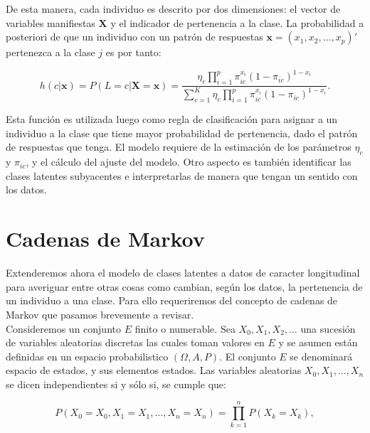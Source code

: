 		De esta manera, cada individuo es descrito por dos dimensiones: el vector de variables manifiestas $\boldsymbol{X}$ y el indicador de pertenencia a la clase.
		La probabilidad a posteriori de que un individuo con un patr\'{o}n de respuestas $\boldsymbol{x}=(x_{1}, x_{2},\ldots, x_{p})'$ pertenezca a la clase 
		$j$ es por tanto:
		
		\begin{equation}
			h(c | \mathbf{x}) = P(L=c | \mathbf{X}=\mathbf{x}) = \frac{\eta_{c} \prod\limits_{i=1}^{p} \pi_{i c}^{x_{i}}\left(1-\pi_{i c}\right)^{1-x_{i}}}{\sum_{c=1}^{K} \eta_{c} \prod_{i=1}^{p} \pi_{i c}^{x_{i}}\left(1-\pi_{i c}\right)^{1-x_{i}}} .
			\label{2.3}
		\end{equation}
		
		Esta funci\'{o}n es utilizada luego como regla de clasificaci\'{o}n para asignar a un individuo a la clase que tiene mayor probabilidad de pertenencia, dado el patr\'{o}n de respuestas que tenga.
		El modelo requiere de la estimaci\'{o}n de los par\'{a}metros ${ \eta  }_{ c }$ y ${ \pi  }_{ ic }$, y el c\'{a}lculo del ajuste del modelo. Otro aspecto es tambi\'{e}n identificar las clases latentes subyacentes e interpretarlas de manera que tengan un sentido con los datos.
		
	\section{Cadenas de Markov}
		Extenderemos ahora el modelo de clases latentes a datos de caracter longitudinal para averiguar entre otras cosas como cambian, seg\'{u}n los datos, la pertenencia de un individuo a una clase. Para ello requeriremos del concepto de cadenas de Markov que pasamos brevemente a revisar.\\ 
		
		Consideremos un conjunto $E$ finito o numerable. Sea $X_{0}, X_{1}, X_{2},\ldots $ una sucesi\'{o}n de variables aleatorias discretas las cuales toman valores en $E$ y se asumen est\'{a}n definidas en un espacio probabilistico $(\Omega,A,P)$. El conjunto $E$ se denominar\'{a} espacio de estados, y sus elementos estados.
		Las variables aleatorias ${X}_{0}, X_{ 1 },\ldots , X_{ n }$ se dicen independientes si y s\'{o}lo si, se cumple que:
		
		\begin{equation}
		P( X_{ 0 }= X_{ { 0} }, X_{ 1 }= X_{ { 1 }},\ldots , X_{ n }= X_{ { n } })=\prod _{ k=1 }^{ n }{ P( X_{ k }= X_{ k }) } ,       \label{2.4}
		\end{equation}
		
